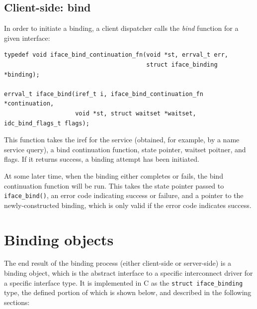\documentclass[a4paper,twoside]{report} %
\begin{document}
\subsection{Client-side: bind}

In order to initiate a binding, a client dispatcher calls the \emph{bind}
function for a given interface:

\begin{lstlisting}
typedef void iface_bind_continuation_fn(void *st, errval_t err,
                                        struct iface_binding *binding);

errval_t iface_bind(iref_t i, iface_bind_continuation_fn *continuation,
                    void *st, struct waitset *waitset, idc_bind_flags_t flags);
\end{lstlisting}

This function takes the iref for the service (obtained, for example, by a name
service query), a bind continuation function, state pointer, waitset poitner,
and flags. If it returns success, a binding attempt has been initiated.

At some later time, when the binding either completes or fails, the bind
continuation function will be run. This takes the state pointer passed to
\lstinline+iface_bind()+, an error code indicating success or failure, and a
pointer to the newly-constructed binding, which is only valid if the error code
indicates success.

\section{Binding objects}\label{sec:binding_objs}

The end result of the binding process (either client-side or server-side) is a
binding object, which is the abstract interface to a specific interconnect
driver for a specific interface type. It is implemented in C as the
\lstinline+struct iface_binding+ type, the defined portion of which is shown
below, and described in the following sections:
\end{document}
